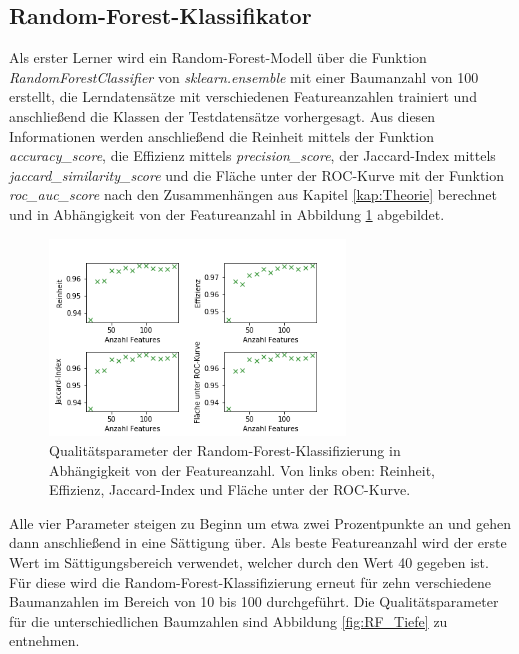 \subsection{Random-Forest-Klassifikator}
Als erster Lerner wird ein Random-Forest-Modell über die Funktion \textit{RandomForestClassifier} von \textit{sklearn.ensemble} mit einer Baumanzahl von 100 erstellt, die Lerndatensätze mit verschiedenen Featureanzahlen trainiert und anschließend die Klassen der Testdatensätze vorhergesagt. Aus diesen Informationen werden anschließend die Reinheit mittels der Funktion \textit{accuracy\_score}, die Effizienz mittels \textit{precision\_score}, der Jaccard-Index mittels \textit{jaccard\_similarity\_score} und die Fläche unter der ROC-Kurve mit der Funktion \textit{roc\_auc\_score} nach den Zusammenhängen aus Kapitel \ref{kap:Theorie} berechnet und in Abhängigkeit von der Featureanzahl in Abbildung \ref{fig:RF_Feat} abgebildet.
\begin{figure}
    \centering
    \includegraphics[width=0.7\textwidth]{plots/RF_featurezahl.png}
    \caption{Qualitätsparameter der Random-Forest-Klassifizierung in Abhängigkeit von der Featureanzahl. Von links oben: Reinheit, Effizienz, Jaccard-Index und Fläche unter der ROC-Kurve.}
    \label{fig:RF_Feat}
  \end{figure}
  \FloatBarrier
  Alle vier Parameter steigen zu Beginn um etwa zwei Prozentpunkte an und gehen dann anschließend in eine Sättigung über. Als beste Featureanzahl wird der erste Wert im Sättigungsbereich verwendet, welcher durch den Wert 40 gegeben ist. Für diese wird die Random-Forest-Klassifizierung erneut für zehn verschiedene Baumanzahlen im Bereich von 10 bis 100 durchgeführt. Die Qualitätsparameter für die unterschiedlichen Baumzahlen sind Abbildung \ref{fig:RF_Tiefe} zu entnehmen.
